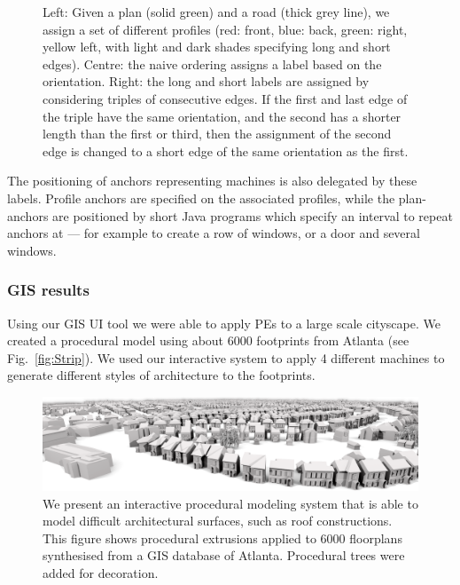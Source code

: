 \begin{figure}
  \centering
  \def\svgwidth{1.0\columnwidth}
  
  \caption[Automatic profile assignment]{\label{fig:assignment} Left: Given a plan (solid green) and a road (thick grey line), we assign a set of different profiles (red: front, blue: back, green: right, yellow left, with light and dark shades specifying long and short edges). Centre: the naive ordering assigns a label based on the orientation. Right: the long and short labels are assigned by considering triples of consecutive edges. If the first and last edge of the triple have the same orientation, and the second has a shorter length than the first or third, then the assignment of the second edge is changed to a short edge of the same orientation as the first.}
\end{figure}

The positioning of anchors representing machines is also delegated by these labels. Profile anchors are specified on the associated profiles, while the plan-anchors are positioned by short Java programs which specify an interval to repeat anchors at --- for example to create a row of windows, or a door and several windows.

\subsubsection{GIS results}

Using our GIS UI tool we were able to apply PEs to a large scale cityscape. We created a procedural model using about 6000 footprints from Atlanta (see Fig.~\ref{fig:Strip}). We used our interactive system to apply 4 different machines to generate different styles of architecture to the footprints.

\begin{figure}
  \centering
  \includegraphics[width=1.0\columnwidth]{strip.png}
  \caption[Large scale GIS results]{\label{fig:Strip} We present an interactive procedural modeling system that is able to model difficult architectural surfaces, such as roof constructions. This figure shows procedural extrusions applied to 6000 floorplans  synthesised from a GIS database of Atlanta. Procedural trees were added for decoration.}
\label{fig:teaser}
\end{figure}

